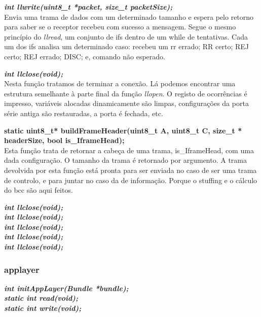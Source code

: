 \documentclass[a4paper]{article}
\begin{document}
\noindent\textbf{\textit{int llwrite(uint8\_t *packet, size\_t packetSize);}}\\
Envia uma trama de dados com um determinado tamanho e espera pelo retorno para
saber se o receptor recebeu com sucesso a mensagem. Segue o mesmo
princípio do \textit{llread}, um conjunto de ifs dentro de um while de
tentativas. Cada um dos ifs analisa um determinado caso: recebeu um rr errado;
RR certo; REJ certo; REJ errado; DISC; e, comando não esperado.\linebreak

\noindent\textbf{\textit{int llclose(void);}}\\
Nesta função tratamos de terminar a conexão. Lá podemos encontrar uma estrutura
semelhante à parte final da função \textit{llopen}. O registo de ocorrências é
impresso, variáveis alocadas dinamicamente são limpas, configurações da porta
série antiga são restauradas, a porta é fechada, etc.\linebreak

\noindent\textbf{static uint8\_t* buildFrameHeader(uint8\_t A, uint8\_t C,
size\_t * headerSize, bool is\_IframeHead);}\\
Esta função trata de retornar a cabeça de uma trama,
is\_IframeHead, com uma dada configuração. O tamanho da trama é retornado por
argumento. A trama devolvida por esta função está pronta para ser enviada no caso de
ser uma trama de controlo, e para juntar no caso da de informação. Porque o
stuffing e o cálculo do bcc são aqui feitos.

\noindent\textbf{\textit{int llclose(void);}}\\
\noindent\textbf{\textit{int llclose(void);}}\\
\noindent\textbf{\textit{int llclose(void);}}\\
\noindent\textbf{\textit{int llclose(void);}}\\
\noindent\textbf{\textit{int llclose(void);}}\\

\subsubsection{applayer}
\noindent\textbf{\textit{int initAppLayer(Bundle *bundle);}}\\

\noindent\textbf{\textit{static int read(void);}}\\

\noindent\textbf{\textit{static int write(void);}}\\
\end{document}
